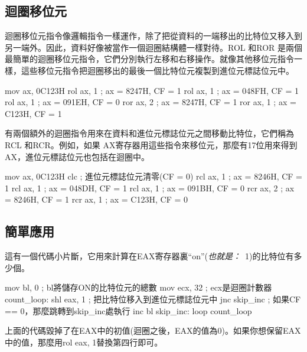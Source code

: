 \subsection{迴圈移位元}

迴圈移位元指令像邏輯指令一樣運作，除了把從資料的一端移出的比特位又移入到另一端外。因此，資料好像被當作一個迴圈結構體一樣對待。{\code ROL} 和{\code ROR} 是兩個最簡單的迴圈移位元指令，它們分別執行左移和右移操作。就像其他移位元指令一樣，這些移位元指令把迴圈移出的最後一個比特位元複製到進位元標誌位元中。
\begin{AsmCodeListing}[frame=none]
      mov    ax, 0C123H
      rol    ax, 1           ; ax = 8247H, CF = 1
      rol    ax, 1           ; ax = 048FH, CF = 1
      rol    ax, 1           ; ax = 091EH, CF = 0
      ror    ax, 2           ; ax = 8247H, CF = 1
      ror    ax, 1           ; ax = C123H, CF = 1
\end{AsmCodeListing}

有兩個額外的迴圈指令用來在資料和進位元標誌位元之間移動比特位，它們稱為{\code
RCL} 和{\code RCR}。例如，如果{\code
AX}寄存器用這些指令來移位元，那麼有17位用來得到{\code
AX}，進位元標誌位元也包括在迴圈中。
\begin{AsmCodeListing}[frame=none]
      mov    ax, 0C123H
      clc                    ; 進位元標誌位元清零(CF = 0)
      rcl    ax, 1           ; ax = 8246H, CF = 1
      rcl    ax, 1           ; ax = 048DH, CF = 1
      rcl    ax, 1           ; ax = 091BH, CF = 0
      rcr    ax, 2           ; ax = 8246H, CF = 1
      rcr    ax, 1           ; ax = C123H, CF = 0
\end{AsmCodeListing}

\subsection{簡單應用\label{sect:AddBitsExample}}

這有一個代碼小片斷，它用來計算在EAX寄存器裏``on''(\emph{也就是：}~1)的比特位有多少個。
\begin{AsmCodeListing}
      mov    bl, 0           ; bl將儲存ON的比特位元的總數
      mov    ecx, 32         ; ecx是迴圈計數器
count_loop:
      shl    eax, 1          ; 把比特位移入到進位元標誌位元中
      jnc    skip_inc        ; 如果CF == 0，那麼跳轉到skip_inc處執行
      inc    bl
skip_inc:
      loop   count_loop
\end{AsmCodeListing}
上面的代碼毀掉了在{\code EAX}中的初值(迴圈之後，{\code EAX}的值為0)。如果你想保留{\code EAX}中的值，那麼用{\code rol  eax, 1}替換第四行即可。

